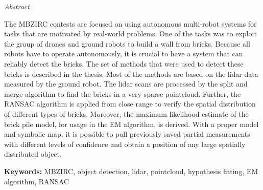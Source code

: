 \vfill
\begin{center}
{\it \large Abstract}
\vspace{0.2cm}

\begin{minipage}{0.8\textwidth}{
The MBZIRC contests are focused on using autonomous multi-robot systems for tasks that are motivated by real-world problems. One of the tasks was to exploit the group of drones and ground robots to build a wall from bricks. Because all robots have to operate autonomously, it is crucial to have a system that can reliably detect the bricks. The set of methods that were used to detect these bricks is described in the thesis. Most of the methods are based on the lidar data measured by the ground robot. The lidar scans are processed by the split and merge algorithm to find the bricks in a very sparse pointcloud. Further, the RANSAC algorithm is applied from close range to verify the spatial distribution of different types of bricks. Moreover, the maximum likelihood estimate of the brick pile model, for usage in the EM algorithm, is derived. With a proper model and symbolic map, it is possible to poll previously saved partial measurements with different levels of confidence and obtain a position of any large spatially distributed object.
\vspace{3mm}
\par \textbf{Keywords:} MBZIRC, object detection, lidar, pointcloud, hypothesis fitting, EM algorithm, RANSAC
}
\end{minipage}
\end{center}
\vfill
\vspace{1cm}
